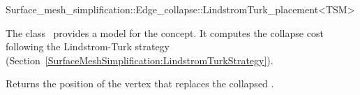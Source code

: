 

\begin{ccRefClass}{Surface_mesh_simplification::Edge_collapse::LindstromTurk_placement<TSM>}


\ccDefinition

The class \ccRefName\ provides a model for the  concept. 
It computes the collapse cost following the Lindstrom-Turk strategy
(Section~\ref{SurfaceMeshSimplification:LindstromTurkStrategy}).


\ccIsModel
{}

\ccCreation
{}  %

  {Returns the position of the vertex that replaces the collapsed .}

\end{ccRefClass}


